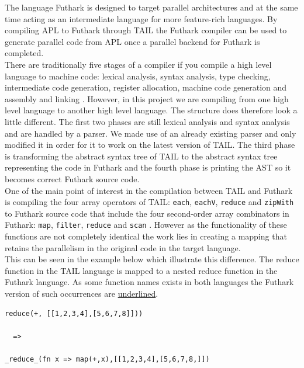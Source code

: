 \documentclass[11pt]{article}
\begin{document}
The language Futhark is designed to target parallel architectures and at the same time acting 
as an intermediate language for more feature-rich languages. By compiling APL to Futhark through TAIL the 
Futhark compiler can be used to generate parallel code from APL once a parallel backend for 
Futhark is completed.\\

There are traditionally five stages of a compiler if you compile a high level language to machine code: 
lexical analysis, syntax analysis, type checking, intermediate code generation, register allocation, machine 
code generation and assembly and linking \cite{TorbenMogensen}. However, in this project we are compiling from 
one high level language to another high level language. The structure does therefore look a little different. 
The first two phases are still lexical analysis and syntax analysis and are handled by a parser.
We made use of an already existing parser \cite{APLACC} and only modified it in order for it to work on the latest 
version of TAIL. The third phase is transforming the abstract syntax tree of TAIL to the abstract syntax tree 
representing the code in Futhark and the fourth phase is printing the AST so it becomes correct 
Futhark source code. \\

One of the main point of interest in the compilation between TAIL and Futhark is compiling the four array operators 
of TAIL: {\tt each}, {\tt eachV}, 
 {\tt reduce} and {\tt zipWith} to Futhark source code that include the four second-order array combinators in Futhark:  
 {\tt map}, {\tt filter}, {\tt reduce} and {\tt scan} \cite{ElsmanDybdal:Array:2014}\cite{TroelsHenriksen}. 
However as the functionality of these functions are not completely 
identical the work lies in creating a mapping that retains the parallelism in the original code in the target language.\\
This can be seen in the example below which illustrate this difference. The reduce function in the
TAIL language is mapped to a nested reduce function in the Futhark language.
As some function names exists in both languages the Futhark version of such occurrences are \underline{underlined}.

\begin{lstlisting}[numbers=none,frame=none]
reduce(+, [[1,2,3,4],[5,6,7,8]]))

  =>

_reduce_(fn x => map(+,x),[[1,2,3,4],[5,6,7,8,]])

\end{lstlisting}
\end{document}

